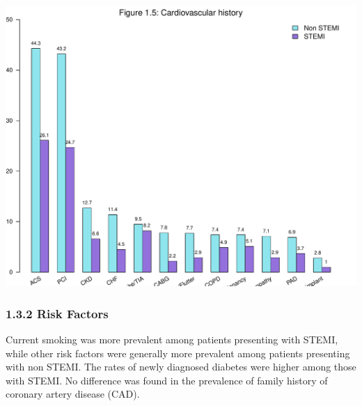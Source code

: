 \documentclass[
]{article}
\begin{document}
\includegraphics{‏‏ACSIS_2024_v1_pdf_without_files/figure-latex/unnamed-chunk-20-1.pdf}

\pagebreak

\subsubsection{1.3.2 Risk Factors}\label{risk-factors}

Current smoking was more prevalent among patients presenting with STEMI,
while other risk factors were generally more prevalent among patients
presenting with non STEMI. The rates of newly diagnosed diabetes were
higher among those with STEMI. No difference was found in the prevalence
of family history of coronary artery disease (CAD).

~
\end{document}
